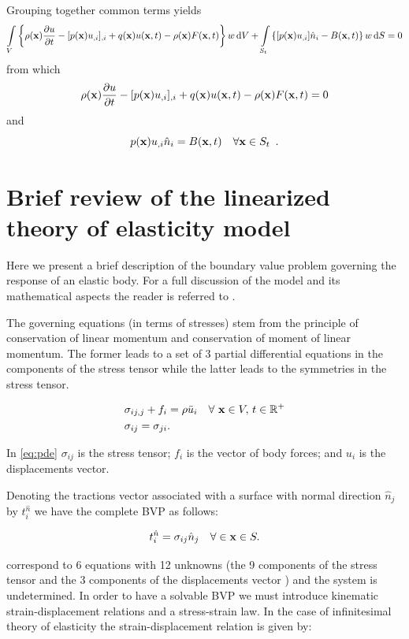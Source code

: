 Grouping together common terms yields
\[\int\limits_V \left\{\rho(\vb x)\pdv{u}{t} - [p(\vb x)u_{,i}]_{,i} + q(\vb x)u(\vb x, t) - \rho(\vb x)F(\vb x, t)\right\} w\dd{V} + \int \limits_{S_t} \left\{[p(\vb x)u_{,i}]\hat n_i - B(\vb x, t) \right\} w\dd{S} = 0\]
from which
\[\rho(\vb x)\pdv{u}{t} - [p(\vb x)u_{,i}]_{,i} + q(\vb x)u(\vb x, t) - \rho(\vb x)F(\vb x, t) = 0\]
and
\[p(\vb x)u_{,i}\hat n_i = B(\vb x, t)  \quad\forall \vb x \in S_t \enspace .\]


\section{Brief review of the linearized theory of elasticity model}
Here we present a brief description of the boundary value problem governing the response of an elastic body. For a full discussion of the model and its mathematical aspects the reader is referred to \cite{shames1997elastic}.

The governing equations (in terms of stresses) stem from the principle of conservation of linear momentum and conservation of moment of linear momentum. The former leads to a set of 3 partial differential equations in the components of the stress tensor while the latter leads to the symmetries in the stress tensor.

\begin{equation} \label{eq:pde}
\begin{aligned}
&\sigma_{ij,j} + {f_i} = \rho\ddot{u}_i \quad \forall\ \vb{x} \in V,\, t \in \mathbb{R}^{+}\\
&\sigma_{ij}=\sigma _{ji}.
\end{aligned} 
\end{equation}

In \cref{eq:pde} $\sigma_{ij}$ is the stress tensor; $f_i$ is the vector of body forces; and $u_i$ is the displacements vector.

Denoting the tractions vector associated with a surface with normal direction $\hat{n}_{j}$ by $t_i^{\hat n}$ we have the complete BVP as follows:

\begin{equation} \label{eq:bcs}
t_i^{\hat n} = \sigma_{ij} \hat{n}_{j} \quad \forall \in \vb{x} \in S.
\end{equation}

 correspond to 6 equations with 12 unknowns (the 9 components of the stress tensor and the 3 components of the displacements vector ) and the system is undetermined. In order to have a solvable BVP we must introduce kinematic strain-displacement relations and a stress-strain law. In the case of infinitesimal theory of elasticity the strain-displacement relation is given by:

